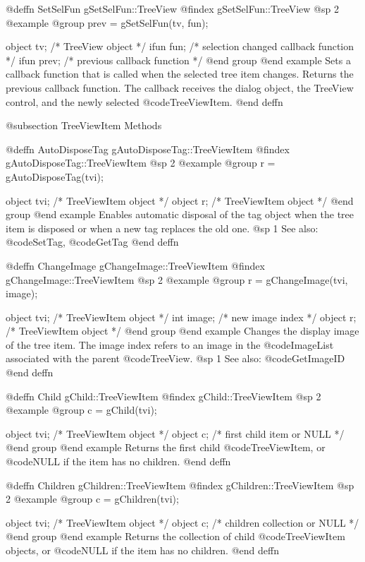 @deffn {SetSelFun} gSetSelFun::TreeView
@findex gSetSelFun::TreeView
@sp 2
@example
@group
prev = gSetSelFun(tv, fun);

object  tv;     /*  TreeView object                        */
ifun    fun;    /*  selection changed callback function     */
ifun    prev;   /*  previous callback function              */
@end group
@end example
Sets a callback function that is called when the selected tree item
changes.  Returns the previous callback function.  The callback receives
the dialog object, the TreeView control, and the newly selected
@code{TreeViewItem}.
@end deffn



@subsection TreeViewItem Methods



@deffn {AutoDisposeTag} gAutoDisposeTag::TreeViewItem
@findex gAutoDisposeTag::TreeViewItem
@sp 2
@example
@group
r = gAutoDisposeTag(tvi);

object  tvi;   /*  TreeViewItem object  */
object  r;     /*  TreeViewItem object  */
@end group
@end example
Enables automatic disposal of the tag object when the tree item is
disposed or when a new tag replaces the old one.
@sp 1
See also:  @code{SetTag}, @code{GetTag}
@end deffn



@deffn {ChangeImage} gChangeImage::TreeViewItem
@findex gChangeImage::TreeViewItem
@sp 2
@example
@group
r = gChangeImage(tvi, image);

object  tvi;     /*  TreeViewItem object  */
int     image;   /*  new image index      */
object  r;       /*  TreeViewItem object  */
@end group
@end example
Changes the display image of the tree item.  The image index refers to
an image in the @code{ImageList} associated with the parent
@code{TreeView}.
@sp 1
See also:  @code{GetImageID}
@end deffn



@deffn {Child} gChild::TreeViewItem
@findex gChild::TreeViewItem
@sp 2
@example
@group
c = gChild(tvi);

object  tvi;   /*  TreeViewItem object             */
object  c;     /*  first child item or NULL         */
@end group
@end example
Returns the first child @code{TreeViewItem}, or @code{NULL} if the item
has no children.
@end deffn



@deffn {Children} gChildren::TreeViewItem
@findex gChildren::TreeViewItem
@sp 2
@example
@group
c = gChildren(tvi);

object  tvi;   /*  TreeViewItem object              */
object  c;     /*  children collection or NULL       */
@end group
@end example
Returns the collection of child @code{TreeViewItem} objects, or
@code{NULL} if the item has no children.
@end deffn



